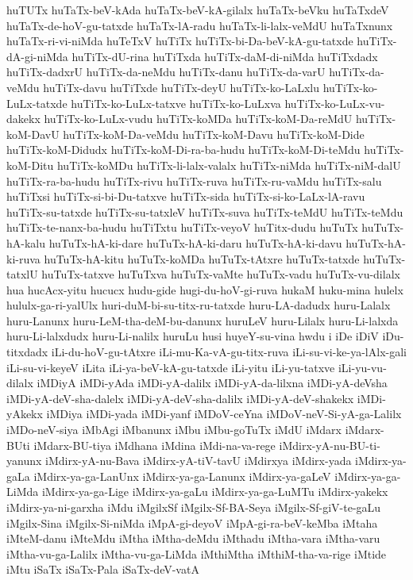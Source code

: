 {huTUTx
huTaTx-beV-kAda
huTaTx-beV-kA-gilalx
huTaTx-beVku
huTaTxdeV
huTaTx-de-hoV-gu-tatxde
huTaTx-lA-radu
huTaTx-li-lalx-veMdU
huTaTxnunx
huTaTx-ri-vi-niMda
huTeTxV
huTiTx
huTiTx-bi-Da-beV-kA-gu-tatxde
huTiTx-dA-gi-niMda
huTiTx-dU-rina
huTiTxda
huTiTx-daM-di-niMda
huTiTxdadx
huTiTx-dadxrU
huTiTx-da-neMdu
huTiTx-danu
huTiTx-da-varU
huTiTx-da-veMdu
huTiTx-davu
huTiTxde
huTiTx-deyU
huTiTx-ko-LaLxlu
huTiTx-ko-LuLx-tatxde
huTiTx-ko-LuLx-tatxve
huTiTx-ko-LuLxva
huTiTx-ko-LuLx-vu-dakekx
huTiTx-ko-LuLx-vudu
huTiTx-koMDa
huTiTx-koM-Da-reMdU
huTiTx-koM-DavU
huTiTx-koM-Da-veMdu
huTiTx-koM-Davu
huTiTx-koM-Dide
huTiTx-koM-Didudx
huTiTx-koM-Di-ra-ba-hudu
huTiTx-koM-Di-teMdu
huTiTx-koM-Ditu
huTiTx-koMDu
huTiTx-li-lalx-valalx
huTiTx-niMda
huTiTx-niM-dalU
huTiTx-ra-ba-hudu
huTiTx-rivu
huTiTx-ruva
huTiTx-ru-vaMdu
huTiTx-salu
huTiTxsi
huTiTx-si-bi-Du-tatxve
huTiTx-sida
huTiTx-si-ko-LaLx-lA-ravu
huTiTx-su-tatxde
huTiTx-su-tatxleV
huTiTx-suva
huTiTx-teMdU
huTiTx-teMdu
huTiTx-te-nanx-ba-hudu
huTiTxtu
huTiTx-veyoV
huTitx-dudu
huTuTx
huTuTx-hA-kalu
huTuTx-hA-ki-dare
huTuTx-hA-ki-daru
huTuTx-hA-ki-davu
huTuTx-hA-ki-ruva
huTuTx-hA-kitu
huTuTx-koMDa
huTuTx-tAtxre
huTuTx-tatxde
huTuTx-tatxlU
huTuTx-tatxve
huTuTxva
huTuTx-vaMte
huTuTx-vadu
huTuTx-vu-dilalx
hua
hucAcx-yitu
hucucx
hudu-gide
hugi-du-hoV-gi-ruva
hukaM
huku-mina
hulelx
hululx-ga-ri-yalUlx
huri-duM-bi-su-titx-ru-tatxde
huru-LA-dadudx
huru-Lalalx
huru-Lanunx
huru-LeM-tha-deM-bu-danunx
huruLeV
huru-Lilalx
huru-Li-lalxda
huru-Li-lalxdudx
huru-Li-nalilx
huruLu
husi
huyeY-su-vina
hwdu
i
iDe
iDiV
iDu-titxdadx
iLi-du-hoV-gu-tAtxre
iLi-mu-Ka-vA-gu-titx-ruva
iLi-su-vi-ke-ya-lAlx-gali
iLi-su-vi-keyeV
iLita
iLi-ya-beV-kA-gu-tatxde
iLi-yitu
iLi-yu-tatxve
iLi-yu-vu-dilalx
iMDiyA
iMDi-yAda
iMDi-yA-dalilx
iMDi-yA-da-lilxna
iMDi-yA-deVsha
iMDi-yA-deV-sha-dalelx
iMDi-yA-deV-sha-dalilx
iMDi-yA-deV-shakekx
iMDi-yAkekx
iMDiya
iMDi-yada
iMDi-yanf
iMDoV-ceYna
iMDoV-neV-Si-yA-ga-Lalilx
iMDo-neV-siya
iMbAgi
iMbanunx
iMbu
iMbu-goTuTx
iMdU
iMdarx
iMdarx-BUti
iMdarx-BU-tiya
iMdhana
iMdina
iMdi-na-va-rege
iMdirx-yA-nu-BU-ti-yanunx
iMdirx-yA-nu-Bava
iMdirx-yA-tiV-tavU
iMdirxya
iMdirx-yada
iMdirx-ya-gaLa
iMdirx-ya-ga-LanUnx
iMdirx-ya-ga-Lanunx
iMdirx-ya-gaLeV
iMdirx-ya-ga-LiMda
iMdirx-ya-ga-Lige
iMdirx-ya-gaLu
iMdirx-ya-ga-LuMTu
iMdirx-yakekx
iMdirx-ya-ni-garxha
iMdu
iMgilxSf
iMgilx-Sf-BA-Seya
iMgilx-Sf-giV-te-gaLu
iMgilx-Sina
iMgilx-Si-niMda
iMpA-gi-deyoV
iMpA-gi-ra-beV-keMba
iMtaha
iMteM-danu
iMteMdu
iMtha
iMtha-deMdu
iMthadu
iMtha-vara
iMtha-varu
iMtha-vu-ga-Lalilx
iMtha-vu-ga-LiMda
iMthiMtha
iMthiM-tha-va-rige
iMtide
iMtu
iSaTx
iSaTx-Pala
iSaTx-deV-vatA
}
